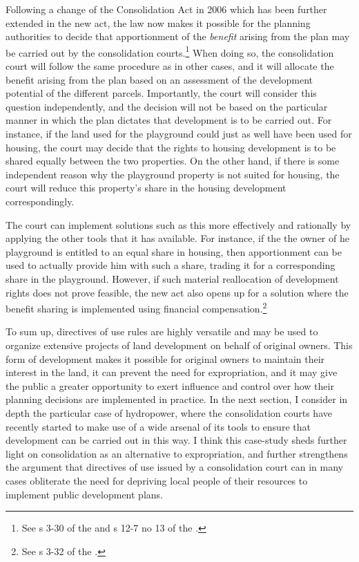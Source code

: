 Following a change of the Consolidation Act in 2006 which has been further extended in the new act, the law now makes it possible for the planning authorities to decide that apportionment of the \emph{benefit} arising from the plan may be carried out by the consolidation courts.\footnote{See s 3-30 of the \cite{lca13} and s 12-7 no 13 of the \cite{pb08}.} When doing so, the consolidation court will follow the same procedure as in other cases, and it will allocate the benefit arising from the plan based on an assessment of the development potential of the different parcels. Importantly, the court will consider this question independently, and the decision will not be based on the particular manner in which the plan dictates that development is to be carried out. For instance, if the land used for the playground could just as well have been used for housing, the court may decide that the rights to housing development is to be shared equally between the two properties. On the other hand, if there is some independent reason why the playground property is not suited for housing, the court will reduce this property's share in the housing development correspondingly.

The court can implement solutions such as this more effectively and rationally by applying the other tools that it has available. For instance, if the the owner of he playground is entitled to an equal share in housing, then apportionment can be used to actually provide him with such a share, trading it for a corresponding share in the playground. However, if such material reallocation of development rights does not prove feasible, the new act also opens up for a solution where the benefit sharing is implemented using financial compensation.\footnote{See s 3-32 of the \cite{lca13}.}

To sum up, directives of use rules are highly versatile and may be used to organize extensive projects of land development on behalf of original owners. This form of development makes it possible for original owners to maintain their interest in the land, it can prevent the need for expropriation, and it may give the public a greater opportunity to exert influence and control over how their planning decisions are implemented in practice. In the next section, I consider in depth the particular case of hydropower, where the consolidation courts have recently started to make use of a wide arsenal of its tools to ensure that development can be carried out in this way. I think this case-study sheds further light on consolidation as an alternative to expropriation, and further strengthens the argument that directives of use issued by a consolidation court can in many cases obliterate the need for depriving local people of their resources to implement public development plans.

